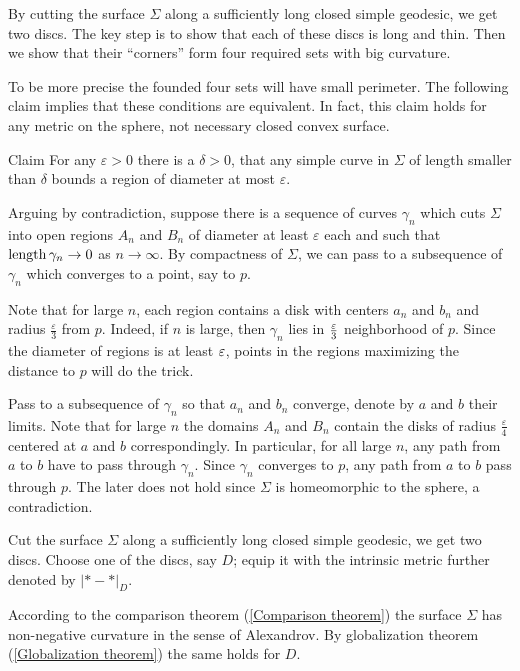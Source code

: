 \documentclass[oneside,a4paper, 12pt]{article}
\begin{document}
By cutting the surface $\Sigma$ along a sufficiently long closed simple geodesic,
we get two discs.
The key step is to show that each of these discs is long and thin.
Then we show that their ``corners'' form four required sets with big curvature.

To be more precise the founded four sets will have small perimeter.
The following claim implies that these conditions are equivalent.
In fact, this claim holds for any metric on the sphere, not necessary closed convex surface.

\begin{thm}{Claim}\label{Lemma:diameter-perimeter}
For any $\varepsilon>0$ there is a $\delta>0$, that any simple curve in $\Sigma$ of length smaller than $\delta$ bounds a region of diameter at most $\varepsilon$.
\end{thm}

Arguing by contradiction, suppose there is a sequence of curves $\gamma_n$ which cuts $\Sigma$ into open regions $A_n$ and $B_n$ of diameter at least $\varepsilon$ each and such that $\mathop{\rm length}\nolimits\gamma_n\to 0$ as $n\to\infty$. 
By compactness of $\Sigma$,
we can pass to a subsequence of $\gamma_n$ which converges to a point, say to $p$. 

Note that for large $n$, each region contains a disk with centers $a_n$ and $b_n$ and radius $\tfrac\varepsilon3$ from $p$. 
Indeed, if $n$ is large, then $\gamma_n$ lies in $\tfrac{\varepsilon}3$ neighborhood of $p$.
Since the diameter of regions is at least $\varepsilon$, points in the regions maximizing the distance to $p$ will do the trick.

Pass to a subsequence of $\gamma_n$ so that $a_n$ and $b_n$ converge, denote by $a$ and $b$ their limits.
Note that for large $n$ the domains $A_n$ and $B_n$ contain the disks of radius $\tfrac\varepsilon4$ centered at $a$ and $b$ correspondingly.
In particular, for all large $n$, any path from $a$ to $b$ have to pass through $\gamma_n$.
Since $\gamma_n$ converges to $p$, any path from $a$ to $b$ pass through $p$.
The later does not hold since $\Sigma$ is homeomorphic to the sphere, a contradiction.	
\qeds


Cut the surface $\Sigma$ along a sufficiently long closed simple geodesic,
we get two discs.
Choose one of the discs, say $D$;
equip it with the intrinsic metric further denoted by $|{*}-{*}|_D$.


According to the comparison theorem (\ref{Comparison theorem}) the surface $\Sigma$ has non-negative curvature in the sense of Alexandrov.
By globalization theorem (\ref{Globalization theorem})
the same holds for $D$.
\end{document}
